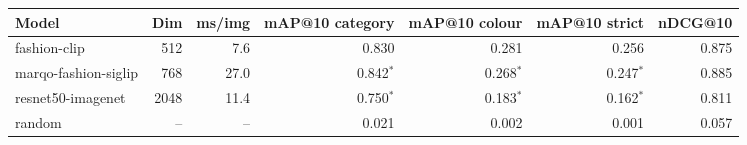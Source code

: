 \begin{tabular}{lrrrrrr}
\toprule
Model & Dim & ms/img & mAP@10 category & mAP@10 colour & mAP@10 strict & nDCG@10 \\
\midrule
fashion-clip & 512 & 7.6 & 0.830 & 0.281 & 0.256 & 0.875 \\
marqo-fashion-siglip & 768 & 27.0 & 0.842$^{*}$ & 0.268$^{*}$ & 0.247$^{*}$ & 0.885 \\
resnet50-imagenet & 2048 & 11.4 & 0.750$^{*}$ & 0.183$^{*}$ & 0.162$^{*}$ & 0.811 \\
random & -- & -- & 0.021 & 0.002 & 0.001 & 0.057 \\
\bottomrule
\end{tabular}
